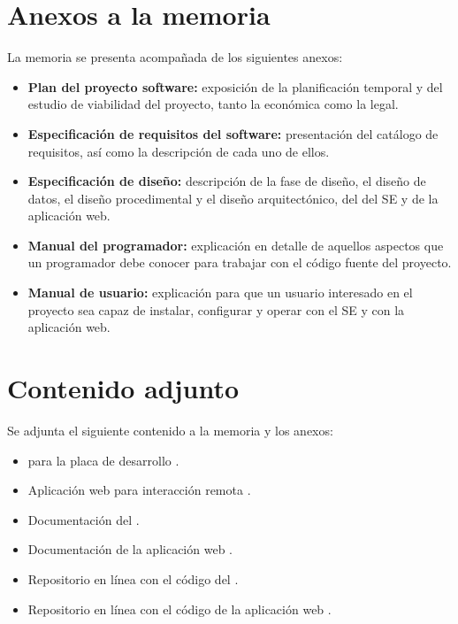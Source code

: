 \section{Anexos a la memoria}\label{sec:anexos}
La memoria se presenta acompañada de los siguientes anexos:

\begin{itemize}
\item
  \textbf{Plan del proyecto software:} exposición de la
  planificación temporal y del estudio de viabilidad del proyecto, tanto la
  económica como la legal.
\item
  \textbf{Especificación de requisitos del software:}
  presentación del catálogo de requisitos, así como la descripción de cada uno
  de ellos.
\item
  \textbf{Especificación de diseño:} descripción de la fase de diseño, el
  diseño de datos, el diseño procedimental y el diseño arquitectónico, del
   del SE y de la aplicación web.
\item
  \textbf{Manual del programador:} explicación en detalle de aquellos aspectos
  que un programador debe conocer para trabajar con el código fuente del
  proyecto.
\item
  \textbf{Manual de usuario:} explicación para que un usuario interesado en el
  proyecto sea capaz de instalar, configurar y operar con el SE y con la
  aplicación web.
\end{itemize}

\clearpage

\section{Contenido adjunto}\label{sec:adjunto}
Se adjunta el siguiente contenido a la memoria y los anexos:

\begin{itemize}
\item
   para la placa de desarrollo \cite{webpage:repo-se}.
\item
  Aplicación web para interacción remota \cite{webpage:repo-aw}.
\item	
  Documentación del  \cite{webpage:repo-se-doc}.
\item	
  Documentación de la aplicación web \cite{webpage:repo-aw-doc}.
\item
  Repositorio en línea con el código del  \cite{webpage:repo-se}.
\item
  Repositorio en línea con el código de la aplicación web \cite{webpage:repo-aw}.
\end{itemize}
